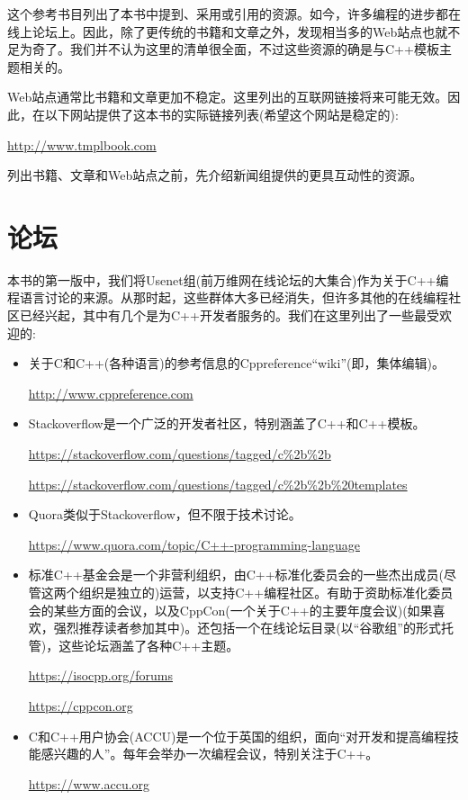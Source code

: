 
这个参考书目列出了本书中提到、采用或引用的资源。如今，许多编程的进步都在线上论坛上。因此，除了更传统的书籍和文章之外，发现相当多的Web站点也就不足为奇了。我们并不认为这里的清单很全面，不过这些资源的确是与C++模板主题相关的。

Web站点通常比书籍和文章更加不稳定。这里列出的互联网链接将来可能无效。因此，在以下网站提供了这本书的实际链接列表(希望这个网站是稳定的):

\url{http://www.tmplbook.com}

列出书籍、文章和Web站点之前，先介绍新闻组提供的更具互动性的资源。

\section*{论坛}

本书的第一版中，我们将Usenet组(前万维网在线论坛的大集合)作为关于C++编程语言讨论的来源。从那时起，这些群体大多已经消失，但许多其他的在线编程社区已经兴起，其中有几个是为C++开发者服务的。我们在这里列出了一些最受欢迎的:

\begin{itemize}
\item 
关于C和C++(各种语言)的参考信息的Cppreference“wiki”(即，集体编辑)。

\url{http://www.cppreference.com}

\item
Stackoverflow是一个广泛的开发者社区，特别涵盖了C++和C++模板。

\url{https://stackoverflow.com/questions/tagged/c%2b%2b}

\url{https://stackoverflow.com/questions/tagged/c%2b%2b%20templates}

\item
Quora类似于Stackoverflow，但不限于技术讨论。

\url{https://www.quora.com/topic/C++-programming-language}

\item
标准C++基金会是一个非营利组织，由C++标准化委员会的一些杰出成员(尽管这两个组织是独立的)运营，以支持C++编程社区。有助于资助标准化委员会的某些方面的会议，以及CppCon(一个关于C++的主要年度会议)(如果喜欢，强烈推荐读者参加其中)。还包括一个在线论坛目录(以“谷歌组”的形式托管)，这些论坛涵盖了各种C++主题。

\url{https://isocpp.org/forums}

\url{https://cppcon.org}

\item
C和C++用户协会(ACCU)是一个位于英国的组织，面向“对开发和提高编程技能感兴趣的人”。每年会举办一次编程会议，特别关注于C++。

\url{https://www.accu.org}
\end{itemize}

